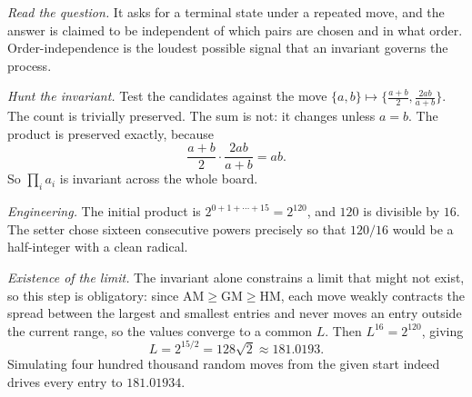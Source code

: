 \emph{Read the question.} It asks for a terminal state under a repeated move, and the answer is claimed to be independent of which pairs are chosen and in what order. Order-independence is the loudest possible signal that an invariant governs the process.

\emph{Hunt the invariant.} Test the candidates against the move $\{a,b\}\mapsto\{\frac{a+b}{2},\frac{2ab}{a+b}\}$. The count is trivially preserved. The sum is not: it changes unless $a=b$. The product is preserved exactly, because
\[
\frac{a+b}{2}\cdot\frac{2ab}{a+b}=ab .
\]
So $\prod_{i}a_{i}$ is invariant across the whole board.

\emph{Engineering.} The initial product is $2^{0+1+\cdots+15}=2^{120}$, and $120$ is divisible by $16$. The setter chose sixteen consecutive powers precisely so that $120/16$ would be a half-integer with a clean radical.

\emph{Existence of the limit.} The invariant alone constrains a limit that might not exist, so this step is obligatory: since $\mathrm{AM}\geq\mathrm{GM}\geq\mathrm{HM}$, each move weakly contracts the spread between the largest and smallest entries and never moves an entry outside the current range, so the values converge to a common $L$. Then $L^{16}=2^{120}$, giving
\[
L=2^{15/2}=128\sqrt{2}\approx 181.0193 .
\]
Simulating four hundred thousand random moves from the given start indeed drives every entry to $181.01934$.

